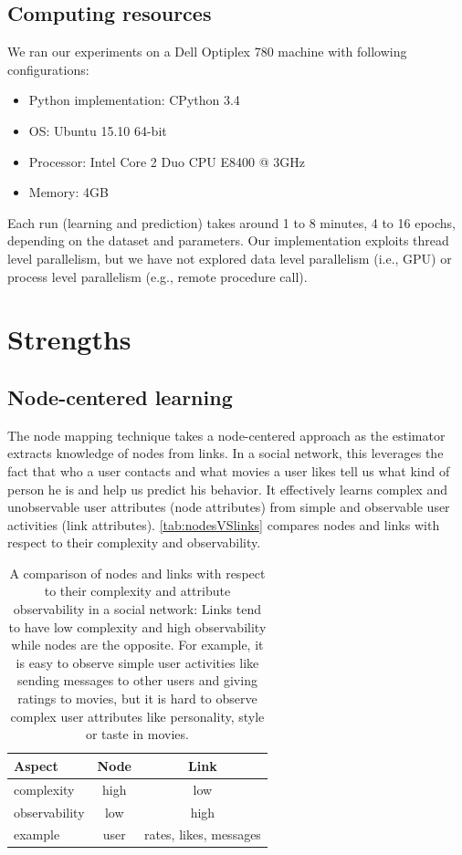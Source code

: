 \documentclass[twocolumn]{article}
\begin{document}
\subsection{Computing resources}
We ran our experiments on a Dell Optiplex 780 machine with following 
configurations:
\begin{itemize}
	\item Python implementation: CPython 3.4
	\item OS: Ubuntu 15.10 64-bit
	\item Processor: Intel Core 2 Duo CPU E8400 @ 3GHz
	\item Memory: 4GB
\end{itemize}
Each run (learning and prediction) takes around 1 to 8 minutes, 4 to 16 epochs, 
depending on the dataset and parameters.
Our implementation exploits thread level parallelism, but we have not explored 
data level parallelism (i.e., GPU) or process level parallelism (e.g., remote 
procedure call).

\section{Strengths}

\subsection{Node-centered learning}
The node mapping technique takes a node-centered approach as the estimator 
extracts knowledge of nodes from links.
In a social network, this leverages the fact that who a user contacts and what 
movies a user likes tell us what kind of person he is and help us predict his 
behavior.
It effectively learns complex and unobservable user attributes (node 
attributes) from simple and observable user activities (link attributes). 
\autoref{tab:nodesVSlinks} compares nodes and links with respect to their 
complexity and observability.
\begin{table}[h]
	\centering
	\caption{A comparison of nodes and links with respect to their complexity 
		and attribute observability in a social network:
		Links tend to have low complexity and high observability while nodes 
		are the opposite.
		For example, it is easy to observe simple user activities like sending 
		messages to other users and giving ratings to movies,
		but it is hard to observe complex user attributes like personality, 
		style or taste in movies.}
	\begin{tabularx}{0.5\textwidth}{ |X|c|c| } \hline
		\textbf{Aspect} & \textbf{Node} & \textbf{Link} \\ \hline
		complexity & high & low \\ \hline
		observability & low & high \\ \hline
		example & user & rates, likes, messages \\ \hline
	\end{tabularx}
	\label{tab:nodesVSlinks}
\end{table}
\end{document}
